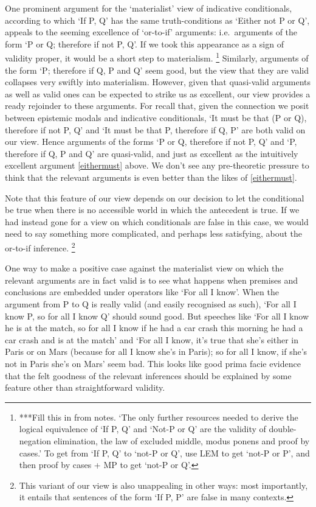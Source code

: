 \documentclass[If.tex]{subfiles}
\begin{document}
One prominent argument for the ‘materialist’ view of indicative conditionals, according to which ‘If P, Q’ has the same truth-conditions as ‘Either not P or Q’, appeals to the seeming excellence of ‘or-to-if’ arguments: i.e.~arguments of the form ‘P or Q; therefore if not P, Q’. If we took this appearance as a sign of validity proper, it would be a short step to materialism.%
\footnote{***Fill this in from notes. ‘The only further resources needed to derive the logical equivalence of ‘If P, Q’ and ‘Not-P or Q’ are the validity of double-negation elimination, the law of excluded middle, modus ponens and proof by cases.’ To get from ‘If P, Q’ to ‘not-P or Q’, use LEM to get ‘not-P or P’, and then proof by cases + MP to get ‘not-P or Q’.}
Similarly, arguments of the form ‘P; therefore if Q, P and Q’ seem good, but the view that they are valid collapses very swiftly into materialism. However, given that quasi-valid arguments as well as valid ones can be expected to strike us as excellent, our view provides a ready rejoinder to these arguments. For recall that, given the connection we posit between epistemic modals and indicative conditionals, ‘It must be that (P or Q), therefore if not P, Q’ and ‘It must be that P, therefore if Q, P’ are both valid on our view. Hence arguments of the forms ‘P or Q, therefore if not P, Q’ and ‘P, therefore if Q, P and Q’ are quasi-valid, and just as excellent as the intuitively excellent argument \ref{eithermust} above. We don't see any pre-theoretic pressure to think that the relevant arguments is even better than the likes of \ref{eithermust}.

Note that this feature of our view depends on our decision to let the conditional be true when there is no accessible world in which the antecedent is true. If we had instead gone for a view on which conditionals are false in this case, we would need to say something more complicated, and perhaps less satisfying, about the or-to-if inference.%
\footnote{This variant of our view is also unappealing in other ways: most importantly, it entails that sentences of the form ‘If P, P’ are false in many contexts.}


One way to make a positive case against the materialist view on which the relevant arguments are in fact valid is to see what happens when premises and conclusions are embedded under operators like ‘For all I know’. When the argument from P to Q is really valid (and easily recognised as such), ‘For all I know P, so for all I know Q’ should sound good. But speeches like ‘For all I know he is at the match, so for all I know if he had a car crash this morning he had a car crash and is at the match’ and ‘For all I know, it's true that she's either in Paris or on Mars (because for all I know she's in Paris); so for all I know, if she's not in Paris she's on Mars’ seem bad. This looks like good prima facie evidence that the felt goodness of the relevant inferences should be explained by some feature other than straightforward validity.
\end{document}
